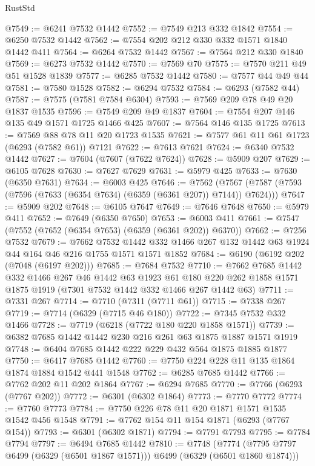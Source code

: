 \begin{lexlean}{RustStd}
\begin{coremodule}
{{@7549 := @6241 @7532 @1442
@7552 := @7549 @213 @332 @1842
@7554 := @6250 @7532 @1442
@7562 := @7554 @202 @212 @330 @332 @1571 @1840 @1442 @411
@7564 := @6264 @7532 @1442
@7567 := @7564 @212 @330 @1840
@7569 := @6273 @7532 @1442
@7570 := @7569 @70
@7575 := @7570 @211 @49 @51 @1528 @1839
@7577 := @6285 @7532 @1442
@7580 := @7577 @44 @49 @44
@7581 := @7580 @1528
@7582 := @6294 @7532
@7584 := @6293 (@7582 @44)
@7587 := @7575 (@7581 @7584 @6304)
@7593 := @7569 @209 @78 @49 @20 @1837 @1535
@7596 := @7549 @209 @49 @1837
@7604 := @7554 @207 @146 @135 @49 @1571 @1725 @1466 @425
@7607 := @7564 @146 @135 @1725
@7613 := @7569 @88 @78 @11 @20 @1723 @1535
@7621 := @7577 @61 @11 @61 @1723 (@6293 (@7582 @61)) @7121
@7622 := @7613 @7621
@7624 := @6340 @7532 @1442
@7627 := @7604 (@7607 (@7622 @7624))
@7628 := @5909 @207
@7629 := @6105 @7628
@7630 := @7627 @7629
@7631 := @5979 @425
@7633 := @7630 (@6350 @7631)
@7634 := @6003 @425
@7646 := @7562
    (@7567 (@7587 (@7593 (@7596 (@7633 (@6354 @7634) (@6359 (@6361 @207)) @7144)) @7624)))
@7647 := @5909 @202
@7648 := @6105 @7647
@7649 := @7646 @7648
@7650 := @5979 @411
@7652 := @7649 (@6350 @7650)
@7653 := @6003 @411
@7661 := @7547 (@7552 (@7652 (@6354 @7653) (@6359 (@6361 @202)) @6370))
@7662 := @7256 @7532
@7679 := @7662
    @7532
    @1442
    @332
    @1466
    @267
    @132
    @1442
    @63
    @1924
    @44
    @164
    @46
    @216
    @1755
    @1571
    @1571
    @1852
@7684 := @6190 (@6192 @202 (@7048 (@6197 @202)))
@7685 := @7684 @7532
@7710 := @7662
    @7685
    @1442
    @332
    @1466
    @267
    @46
    @1442
    @63
    @1923
    @61
    @180
    @220
    @262
    @1858
    @1571
    @1875
    @1919
    (@7301 @7532 @1442 @332 @1466 @267 @1442 @63)
@7711 := @7331 @267
@7714 := @7710 (@7311 (@7711 @61))
@7715 := @7338 @267
@7719 := @7714 (@6329 (@7715 @46 @180))
@7722 := @7345 @7532 @332 @1466
@7728 := @7719 (@6218 (@7722 @180 @220 @1858 @1571))
@7739 := @6382 @7685 @1442 @1442 @230 @216 @261 @63 @1875 @1887 @1571 @1919
@7748 := @6404 @7685 @1442 @222 @229 @432 @564 @1875 @1885 @1877
@7750 := @6417 @7685 @1442
@7760 := @7750 @224 @228 @11 @135 @1864 @1874 @1884 @1542 @441 @1548
@7762 := @6285 @7685 @1442
@7766 := @7762 @202 @11 @202 @1864
@7767 := @6294 @7685
@7770 := @7766 (@6293 (@7767 @202))
@7772 := @6301 (@6302 @1864)
@7773 := @7770 @7772
@7774 := @7760 @7773
@7784 := @7750 @226 @78 @11 @20 @1871 @1571 @1535 @1542 @456 @1548
@7791 := @7762 @154 @11 @154 @1871 (@6293 (@7767 @154))
@7793 := @6301 (@6302 @1871)
@7794 := @7791 @7793
@7795 := @7784 @7794
@7797 := @6494 @7685 @1442
@7810 := @7748
    (@7774 (@7795 @7797 @6499 (@6329 (@6501 @1867 @1571))) @6499 (@6329 (@6501 @1860 @1874)))
}}
\end{coremodule}
\end{lexlean}
